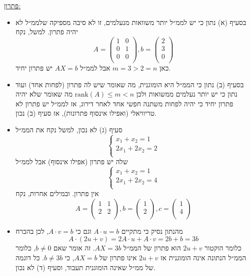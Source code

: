 \documentclass[12pt, a4paper]{article}
\begin{document}
\begin{enumerate}
\underline{פתרון:}
\begin{itemize}
\item
בסעיף (א) נתון כי יש לממ״ל יותר משוואות מנעלמים, זו לא סיבה מספיקה שלממ״ל לא יהיה פתרון. למשל, נקח
$$A=
\begin{pmatrix}
1&0\\
0&1\\
0&0\\
\end{pmatrix},
b=\begin{pmatrix}
2\\3\\0\\
\end{pmatrix}$$
כאן
$m=3>2=n$
אבל
לממ״ל
$AX=b$
יש פתרון יחיד.
\item
בסעיף (ב) נתון כי הממ״ל היא הומוגנית, מה שאומר שיש לה פתרון (לפחות אחד) 
ועוד נתון כי יש יותר נעלמים ממשואות ולכן
$\mathrm{rank}(A)\le m<n$
מה שאומר שלא יהיה פתרון יחיד כי יהיה לפחות משתנה חפשי אחד לאחר דירוג, אז לממ״ל יש פתרון לא טריוויאלי (ואפילו אינסוף פתרונות),
אז סעיף (ב) נכון.
\item
סעיף (ג) לא נכון, למשל נקח
את הממ״ל
$$\begin{cases}
x_1+x_2=1\\
2x_1+2x_2=2\\
\end{cases}$$
שלה  יש פתרון (אפילו אינסוף) אבל לממ״ל
$$\begin{cases}
x_1+x_2=1\\
2x_1+2x_2=4\\
\end{cases}$$
 אין פתרון. ובמילים אחרות, נקח
$$A=\begin{pmatrix}
1&1\\
2&2\\
\end{pmatrix},
b=\begin{pmatrix}
1\\2\\
\end{pmatrix},
c=\begin{pmatrix}
1\\4\\
\end{pmatrix}$$
\item
מהנתון נסיק כי מתקיים
$A\cdot u=b$
וגם כי
$A\cdot v=b$,
לכן בהכרח
$$A\cdot(2u+v)=2A\cdot u+A\cdot v=2b+b=3b$$
כלומר
הוקטור
$2u+v$
הוא פתרון של הממ״ל
$AX=3b$.
זה אומר שאם
$b\neq0$,
כלומר הממ״ל הנתונה אינה הומוגנית אז
$2u+v$
אינו פתרון של
$AX=b$,
כי
$b\neq 3b$.
כל דוגמה של ממ״ל שאינה הומוגנית תעבוד, וסעיף (ד) לא נכון.
\end{itemize}


\end{enumerate}
\end{document}
